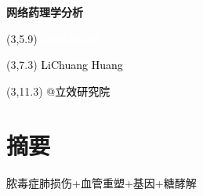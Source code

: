 \documentclass[
]{article}
\author{}
\date{\vspace{-2.5em}}
\begin{document}
\begin{titlepage} 
\begin{center} \textbf{\Huge 网络药理学分析}
\vspace{4em} \begin{textblock}{10}(3,5.9) \huge
\textbf{\textcolor{white}{2024-01-08}}
\end{textblock} \begin{textblock}{10}(3,7.3)
\Large \textcolor{black}{LiChuang Huang}
\end{textblock} \begin{textblock}{10}(3,11.3)
\Large \textcolor{black}{@立效研究院}
\end{textblock} \end{center} \end{titlepage}
\restoregeometry


\tableofcontents

\listoffigures

\listoftables

\newpage


\hypertarget{abstract}{%
\section{摘要}\label{abstract}}

脓毒症肺损伤+血管重塑+基因+糖酵解
\end{document}
